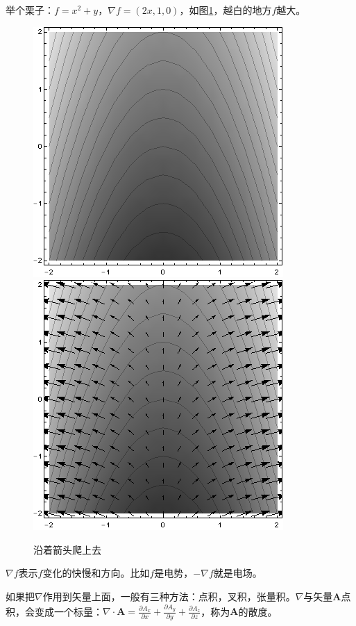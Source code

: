 举个栗子：$f=x^2+y$，$\nabla f=(2x,1,0)$，如图\ref{fig-vec-grad}，越白的地方$f$越大。
\begin{figure}[htb]
\centering
\includegraphics[scale=0.5]{fig/vec-grad}
\includegraphics[scale=0.5]{fig/vec-grad-2}
\caption{沿着箭头爬上去}
\label{fig-vec-grad}
\end{figure}

$\nabla f$表示$f$变化的快慢和方向。比如$f$是电势，$-\nabla f$就是电场。

如果把$\nabla$作用到矢量上面，一般有三种方法：点积，叉积，张量积。$\nabla$与矢量$\mathbf{A}$点积，会变成一个标量：$\nabla \cdot \mathbf{A}=\frac{\partial A_x}{\partial x}+\frac{\partial A_y}{\partial y}+\frac{\partial A_z}{\partial z}$，称为$\mathbf{A}$的散度。

